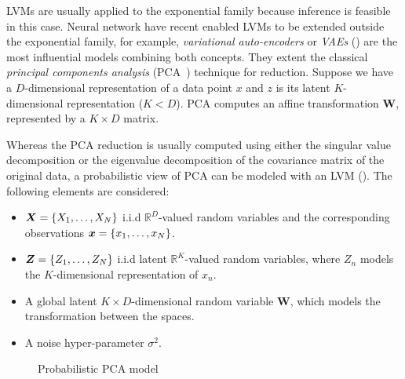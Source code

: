 
LVMs are usually applied to the exponential family because inference is feasible in this case. Neural network have recent enabled LVMs to be extended outside the exponential family, for example, \emph{variational auto-encoders} or \emph{VAEs} (\cite{kingma2013auto}) are the most influential models combining both concepts. They extent the classical \emph{principal components analysis} (PCA~\cite{pearson1901liii}) technique for  reduction. Suppose we have a \(D\)-dimensional representation of a data point \(x\) and \(z\) is its latent \(K\)-dimensional representation (\(K < D\)). PCA computes an affine transformation \(\bm{W}\), represented by a \(K \times D\) matrix.

Whereas the PCA reduction is usually computed using either the singular value decomposition or the eigenvalue decomposition of the covariance matrix of the original data, a probabilistic view of PCA can be modeled with an LVM (\cite{tipping1999probabilistic}). The following elements are considered:

\begin{itemize}
  \item \(\bm{X} = \{X_{1},\dots,X_{N}\}\) i.i.d \(\mathbb{R}^{D}\)-valued random variables and the corresponding observations \(\bm{x} = \{x_{1},\dots, x_{N}\}\).
  \item \(\bm{Z} = \{Z_{1}, \dots, Z_{N}\}\) i.i.d latent \(\mathbb{R}^{K}\)-valued random variables, where \(Z_{n}\) models the \(K\)-dimensional representation of \(x_{n}\).
  \item A global latent \(K\times D\)-dimensional random variable \(\bm{W}\), which models the transformation between the spaces.
  \item A noise hyper-parameter \(\sigma^{2}\).
\end{itemize}

\begin{figure}[h!]
  \centering
  \caption{Probabilistic PCA model}\label{fig:ppca}
\end{figure}

